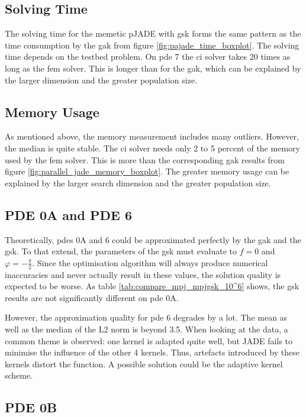 \documentclass[./\jobname.tex]{subfiles}
\begin{document}
\subsection{Solving Time}
The solving time for the memetic pJADE with \gls{gsk} forms the same pattern as the time consumption by the \gls{gak} from figure \ref{fig:pajade_time_boxplot}. The solving time depends on the testbed problem. On \gls{pde} 7 the \gls{ci} solver takes 20 times as long as the \gls{fem} solver. This is longer than for the \gls{gak}, which can be explained by the larger dimension and the greater population size.  

\subsection{Memory Usage}

As mentioned above, the memory measurement includes many outliers. However, the median is quite stable. The \gls{ci} solver needs only 2 to 5 percent of the memory used by the \gls{fem} solver. This is more than the corresponding \gls{gak} results from figure \ref{fig:parallel_jade_memory_boxplot}. The greater memory usage can be explained by the larger search dimension and the greater population size. 

\subsection{PDE 0A and PDE 6}

Theoretically, \gls{pde}s 0A and 6 could be approximated perfectly by the \gls{gak} and the \gls{gsk}. To that extend, the parameters of the \gls{gsk} must evaluate to $f=0$ and $\varphi=-\frac{\pi}{2}$. Since the optimisation algorithm will always produce numerical inaccuracies and never actually result in these values, the solution quality is expected to be worse. As table \ref{tab:compare_mpj_mpjgsk_10^6} shows, the \gls{gsk} results are not significantly different on \gls{pde} 0A. 

However, the approximation quality for \gls{pde} 6 degrades by a lot. The mean as well as the median of the L2 norm is beyond 3.5. When looking at the data, a common theme is observed: one kernel is adapted quite well, but JADE fails to minimise the influence of the other 4 kernels. Thus, artefacts introduced by these kernels distort the function. A possible solution could be the adaptive kernel scheme. 


\subsection{PDE 0B}
\end{document}
